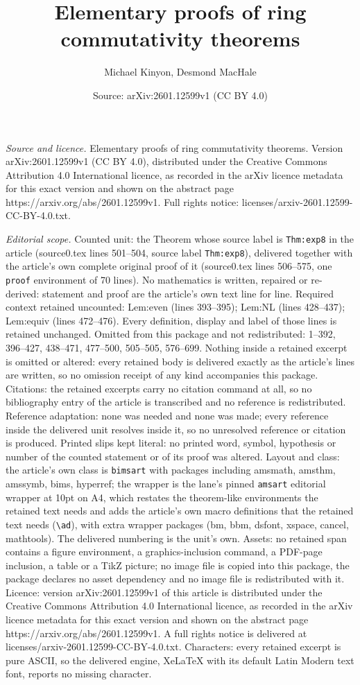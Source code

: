 \documentclass[10pt,a4paper]{amsart}
\title[Elementary proofs of ring commutativity theorems]{Elementary proofs of ring commutativity theorems}
\author{Michael Kinyon, Desmond MacHale}
\date{Source: arXiv:2601.12599v1 (CC BY 4.0)}
\begin{document}
\maketitle

\noindent\emph{Source and licence.} Elementary proofs of ring commutativity theorems. Version arXiv:2601.12599v1 (CC BY 4.0), distributed under the Creative Commons Attribution 4.0 International licence, as recorded in the arXiv licence metadata for this exact version and shown on the abstract page https://arxiv.org/abs/2601.12599v1. Full rights notice: licenses/arxiv-2601.12599-CC-BY-4.0.txt.\par\smallskip

\noindent\textit{Editorial scope.} Counted unit: the Theorem whose source label is \texttt{Thm:exp8} in the article (source0.tex lines 501--504, source label \texttt{Thm:exp8}), delivered together with the article's own complete original proof of it (source0.tex lines 506--575, one \texttt{proof} environment of 70 lines). No mathematics is written, repaired or re-derived: statement and proof are the article's own text line for line. Required context retained uncounted: Lem:even (lines 393--395); Lem:NL (lines 428--437); Lem:equiv (lines 472--476). Every definition, display and label of those lines is retained unchanged. Omitted from this package and not redistributed: 1--392, 396--427, 438--471, 477--500, 505--505, 576--699. Nothing inside a retained excerpt is omitted or altered: every retained body is delivered exactly as the article's lines are written, so no omission receipt of any kind accompanies this package. Citations: the retained excerpts carry no citation command at all, so no bibliography entry of the article is transcribed and no reference is redistributed. Reference adaptation: none was needed and none was made; every reference inside the delivered unit resolves inside it, so no unresolved reference or citation is produced. Printed slips kept literal: no printed word, symbol, hypothesis or number of the counted statement or of its proof was altered. Layout and class: the article's own class is \texttt{bimsart} with packages including amsmath, amsthm, amssymb, bims, hyperref; the wrapper is the lane's pinned \texttt{amsart} editorial wrapper at 10pt on A4, which restates the theorem-like environments the retained text needs and adds the article's own macro definitions that the retained text needs (\texttt{\textbackslash ad}), with extra wrapper packages (bm, bbm, dsfont, xspace, cancel, mathtools). The delivered numbering is the unit's own. Assets: no retained span contains a figure environment, a graphics-inclusion command, a PDF-page inclusion, a table or a TikZ picture; no image file is copied into this package, the package declares no asset dependency and no image file is redistributed with it. Licence: version arXiv:2601.12599v1 of this article is distributed under the Creative Commons Attribution 4.0 International licence, as recorded in the arXiv licence metadata for this exact version and shown on the abstract page https://arxiv.org/abs/2601.12599v1. A full rights notice is delivered at licenses/arxiv-2601.12599-CC-BY-4.0.txt. Characters: every retained excerpt is pure ASCII, so the delivered engine, XeLaTeX with its default Latin Modern text font, reports no missing character.
\end{document}
